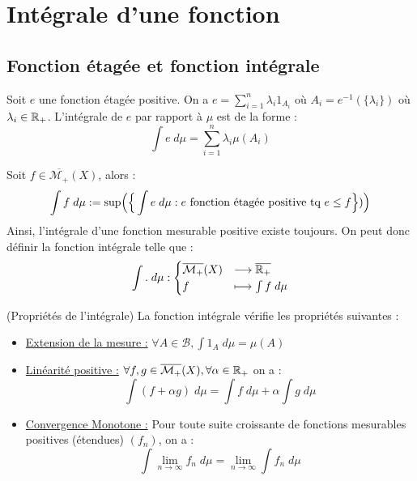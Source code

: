 
\section{Intégrale d'une fonction}

\subsection{Fonction étagée et fonction intégrale}

\begin{definition}
    Soit $e$ une fonction étagée positive. On a $e = \sum_{i=1}^{n} \lambda_i 1_{A_i}$ où $A_i = e^{-1}(\{\lambda_i\})$ où $\lambda_i \in \mathbb{R}_+$.
    L'intégrale de $e$ par rapport à $\mu$ est de la forme :
        \[ \boxed{ \int e \; d \mu = \sum_{i=1}^{n} \lambda_i \mu (A_i) } \] 
\end{definition}

\begin{definition}
    Soit $f \in \overline{\mathcal{M}_+}(X)$, alors : 
        \[ \int f \; d \mu := \sup \Bigl( \Bigr\{ \int e \; d \mu : e \text{ fonction étagée positive tq } e \leq f \Bigl\}) \Bigr) \] 
    Ainsi, l'intégrale d'une fonction mesurable positive existe toujours.
    On peut donc définir la fonction intégrale telle que :
        \[ \int . \; d \mu : 
            \begin{cases}
                \overline{\mathcal{M}_+}(X) & \longrightarrow \overline{\mathbb{R}_+} \\ 
                f & \longmapsto \int f \; d \mu 
            \end{cases}
        \] 
\end{definition}

\begin{prop}(Propriétés de l'intégrale)
    La fonction intégrale vérifie les propriétés suivantes :
    \begin{itemize}
        \item \underline{Extension de la mesure :} $\forall A \in \mathcal{B}, \int 1 _A \; d \mu = \mu(A)$ 
        \item \underline{Linéarité positive :} $\forall f, g \in \overline{\mathcal{M}_+}(X), \forall \alpha \in \mathbb{R}_+$ on a :
            \[ \int (f + \alpha g) \; d \mu = \int f \; d \mu + \alpha \int g \; d \mu \]
        \item \underline{Convergence Monotone :} Pour toute suite croissante de fonctions mesurables positives (étendues) $(f_n)$, on a :
            \[ \boxed { \int \lim_{n\to\infty} f_n \; d \mu = \lim_{n\to\infty} \int f_n \; d \mu }\] 
    \end{itemize}
\end{prop}

